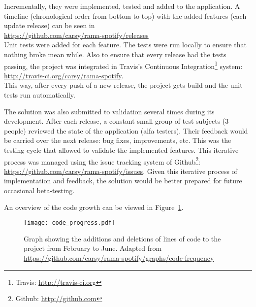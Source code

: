     Incrementally, they were implemented, tested and added to the application.
    A timeline (chronological order from bottom to top) with the added features (each update release) can be seen in \\ 
    \indent \url{https://github.com/carsy/rama-spotify/releases} \\

    Unit tests were added for each feature.
    The tests were run locally to ensure that nothing broke mean while.
    Also to ensure that every release had the tests passing, the project was integrated in Travis's Continuous Integration\footnote{Travis: \url{http://travis-ci.org}} system: \\
    \indent \url{http://travis-ci.org/carsy/rama-spotify}. \\

    This way, after every push of a new release, the project gets build and the unit tests run automatically.

    The solution was also submitted to validation several times during its development.
    After each release, a constant small group of test subjects (3 people) reviewed the state of the application (alfa testers).
    Their feedback would be carried over the next release: bug fixes, improvements, etc.
    This was the testing cycle that allowed to validate the implemented features.
    This iterative process was managed using the issue tracking system of Github\footnote{Github: \url{http://github.com}}: \url{https://github.com/carsy/rama-spotify/issues}.
    Given this iterative process of implementation and feedback, the solution would be better prepared for future occasional beta-testing.

    An overview of the code growth can be viewed in Figure~\ref{fig:code_progress}.

    \begin{figure}
      \begin{center}
        \texttt{[image: code\_progress.pdf]}
      \end{center}
      \caption{Graph showing the additions and deletions of lines of code to the project from February to June. Adapted from \url{https://github.com/carsy/rama-spotify/graphs/code-frequency}}
      \label{fig:code_progress}
    \end{figure}

    


